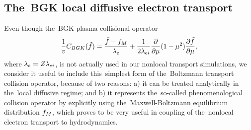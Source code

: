 \subsection{The~BGK local diffusive electron transport}
\label{sec:BGKDiffusiveRegime}

Even though the~BGK plasma collisional operator \cite{BGK_1954}
\begin{equation}
  \frac{1}{v}C_{BGK}(\tilde{f})
  =
  \frac{\tilde{f} - f_M}{\lambda_e}
  + \frac{1}{2 \lambda_{ei}}
  \frac{\partial{}}{\partial{\mu}}(1 - \mu^2)\frac{\partial{\tilde{f}}}{\partial{\mu}} ,
  \label{eq:BGK_model_1D}
\end{equation}
where $\lambda_e = Z \lambda_{ei}$, 
is not actually used in our nonlocal transport simulations, we consider it 
useful to include this~simplest form of the~Boltzmann transport collision 
operator, because of two reasons: a) it can be treated analytically in 
the~local diffusive regime; and b) it represents the~so-called phenomenological
collision operator by explicitly using the~Maxwell-Boltzmann equilibrium 
distribution $f_M$, which proves to be very useful in coupling of the~nonlocal 
electron transport to hydrodynamics.

